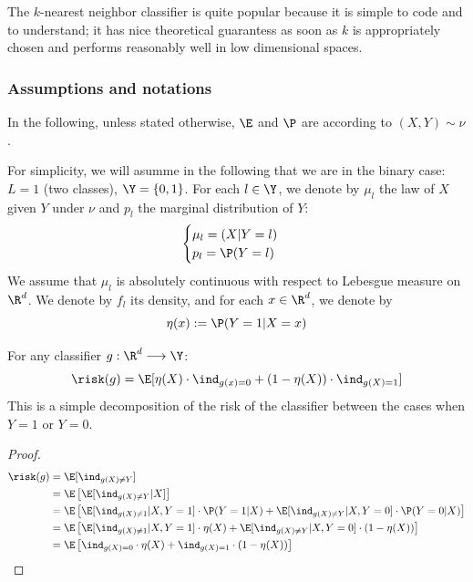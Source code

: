 \documentclass[toc, titlepaged]{../cs-classes/cs-classes}
\begin{document}
The $k$-nearest neighbor classifier is quite popular because it is simple to code and to understand; it has nice theoretical guarantess as soon as $k$ is appropriately chosen and performs reasonably well in low dimensional spaces. 

\subsubsection{Assumptions and notations}
In the following, unless stated otherwise, $\E$ and $\P$ are according to $(X, Y)\sim\nu$.

For simplicity, we will asumme in the following that we are in the binary case: $L=1$ (two classes), $\Y=\{0, 1\}$. For each $l\in\Y$, we denote by $\mu_l$ the law of $X$ given $Y$ under $\nu$ and $p_l$ the marginal distribution of $Y$:
\begin{equation*}
    \begin{cases}
        \mu_l = (X | Y=l) \\
        p_l = \P(Y=l)
    \end{cases}
\end{equation*}
We assume that $\mu_l$ is absolutely continuous with respect to Lebesgue measure on $\R^d$. We denote by $f_l$ its density, and for each $x\in\R^d$, we denote by
\begin{equation*}
    \eta(x) := \P(Y=1|X=x)
\end{equation*}

\begin{lemma}
    For any classifier $g:\R^d\longrightarrow\Y$:
    \begin{equation*}
        \risk(g) = \E[\eta(X)\cdot\ind_{g(x)=0}+(1-\eta(X))\cdot\ind_{g(X)=1}]
    \end{equation*}
    This is a simple decomposition of the risk of the classifier between the cases when $Y=1$ or $Y=0$.
\end{lemma}
\begin{proof}
    \begin{equation*}        
        \begin{aligned}
            \risk(g) &= \E[\ind_{g(X)\neq Y}]\\
            &= \E\left[\E[\ind_{g(X)\neq Y}|X]\right] \\
            &= \E\left[\E[\ind_{g(X)\neq 1}|X, Y = 1]\cdot\P(Y=1|X) + \E[\ind_{g(X)\neq Y}|X, Y=0]\cdot\P(Y=0|X)\right]\\
            &= \E\left[\E[\ind_{g(X)\neq 1}|X, Y = 1]\cdot\eta(X) + \E[\ind_{g(X)\neq Y}|X, Y=0]\cdot(1-\eta(X))\right]\\
            &= \E\left[\ind_{g(X)=0}\cdot\eta(X) + \ind_{g(X)=1}\cdot(1-\eta(X))\right]
        \end{aligned}
    \end{equation*}
\end{proof}
\end{document}

